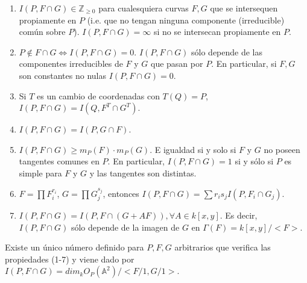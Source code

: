 \begin{enumerate}
\item $I(P,F\cap G)\in \mathbb{Z}_{\ge 0}$ para cualesquiera curvas $F,G$ que se intersequen propiamente en $P$ (i.e. que no tengan ninguna componente (irreducible) común sobre $P$). $I(P,F\cap G)=\infty$ si no se intersecan propiamente en $P$. 

\item $P\not \in F\cap G \Leftrightarrow I(P,F\cap G)=0$. $I(P,F\cap G)$ sólo depende de las componentes irreducibles de $F$ y $G$ que pasan por $P$. En particular, si $F,G$ son constantes no nulas $I(P,F\cap G)=0$. 

\item Si $T$ es un cambio de coordenadas con $T(Q)=P$, $I(P,F\cap G)=I(Q,F^T\cap G^T)$. 

\item $I(P,F\cap G) = I(P,G\cap F)$. 

\item $I(P,F\cap G)\ge m_P(F)\cdot m_P(G)$. E igualdad si y solo si $F$ y $G$ no poseen tangentes comunes en $P$. En particular, $I(P,F\cap G)=1$ si y sólo si $P$ es simple para $F$ y $G$ y las tangentes son distintas.

\item $F=\prod F_i^{r_i}$, $G=\prod G_j^{s_j}$, entonces $I(P,F\cap G)=\sum r_i s_j I(P,F_i\cap G_j)$.   

\item $I(P,F\cap G)= I(P, F\cap (G+AF)), \forall A \in k[x,y]$. Es decir, $I(P,F\cap G)$ sólo depende de la imagen de $G$ en $\Gamma(F)=k[x,y]/<F>$. 
\end{enumerate}

\begin{Teo}
Existe un único número definido para $P,F,G$ arbitrarios que verifica las propiedades (1-7) y viene dado por $I(P,F\cap G)=dim_k O_P(\mathbb{A}^2)/<F/1,G/1>$. 
\end{Teo}

